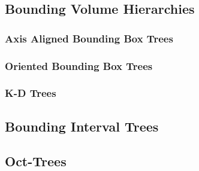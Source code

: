 \documentclass{article}
\begin{document}
\subsection{Bounding Volume Hierarchies}

\subsubsection{Axis Aligned Bounding Box Trees}

\subsubsection{Oriented Bounding Box Trees}

\subsubsection{K-D Trees}

\subsection{Bounding Interval Trees}

\subsection{Oct-Trees}
\end{document}
